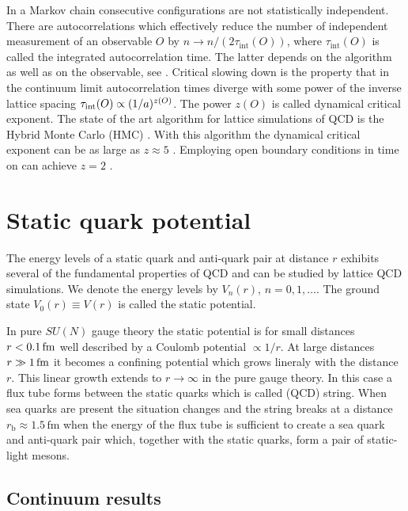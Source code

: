 \documentclass{PoS}
\newcommand{\SU}[1]{SU(#1)}
\def\rb{r_{\mathrm{b}}}
\begin{document}
In a Markov chain consecutive configurations are not statistically independent.
There are autocorrelations which effectively reduce the number of independent 
measurement of an observable $O$ by 
$n\longrightarrow n/(2\tau_{\mathrm{int}}(O))$, where $\tau_{\mathrm{int}}(O)$ is
called the integrated autocorrelation time. The latter depends on the algorithm
as well as on the observable, see \cite{Wolff:2003sm}.
Critical slowing down is the property that in the continuum limit
autocorrelation times diverge with some power of the inverse lattice spacing 
$\tau_{\rm int}(O)\propto (1/a)^{z(O)}$. The power $z(O)$ is called
dynamical critical exponent. The state of the art algorithm for
lattice simulations of QCD is the Hybrid Monte Carlo (HMC) \cite{Duane:1987de}.
With this algorithm the dynamical critical exponent
can be as large as $z\approx5$ \cite{Schaefer:2010hu}.
Employing open boundary conditions in time on can achieve
$z=2$ \cite{Luscher:2011kk}.

\section{Static quark potential}

The energy levels of a static quark and anti-quark pair at distance $r$
exhibits several of the fundamental properties of QCD and can be studied
by lattice QCD simulations. We denote the energy levels by
$V_n(r)$, $n=0,1,\ldots$. The ground state $V_{0}(r)\equiv V(r)$ is called
the static potential.

In pure $\SU{N}$ gauge theory the static potential is for small distances
$r<0.1\,{\rm fm}$ well described by a Coulomb potential $\propto 1/r$. 
At large distances $r\gg1\,{\rm fm}$ it becomes a confining potential which 
grows lineraly with the distance $r$. This linear growth extends to $r\to\infty$
in the pure gauge theory. In this case a flux tube forms between the static
quarks which is called (QCD) string.
When sea quarks are present the situation changes and the string breaks
at a distance $\rb\approx1.5\,\mathrm{fm}$ when the energy of the flux tube is
sufficient to create a sea quark and anti-quark pair which, together with
the static quarks, form a pair of static-light mesons.

\subsection{Continuum results}
\end{document}
